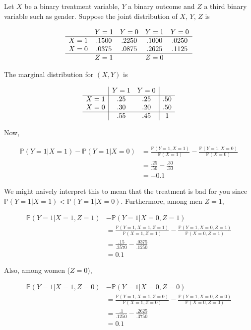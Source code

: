 Let \(X\) be a binary treatment variable, \(Y\) a binary outcome and
\(Z\) a third binary variable such as gender. Suppose the joint
distribution of \(X\), \(Y\), \(Z\) is

\[
\begin{array}{ccccc}
       & Y = 1 & Y = 0 & Y = 1 & Y = 0 \\
\hline
X = 1 & .1500 & .2250 & .1000 & .0250 \\
X = 0 & .0375 & .0875 & .2625 & .1125 \\
\hline
      & Z = 1 & & Z = 0 &
\end{array}
\]

The marginal distribution for \((X, Y)\) is

\[
\begin{array}{c|cc|c}
       & Y = 1 & Y = 0 & \\
\hline
X = 1 & .25 & .25 & .50 \\
X = 0 & .30 & .20 & .50 \\
\hline
      & .55 & .45 & 1
\end{array}
\]

Now,

\begin{align*}
\mathbb{P}(Y = 1 | X = 1) - \mathbb{P}(Y = 1 | X = 0) 
&= \frac{\mathbb{P}(Y = 1, X = 1)}{\mathbb{P}(X = 1)} - \frac{\mathbb{P}(Y = 1, X = 0)}{\mathbb{P}(X = 0)} \\
&= \frac{.25}{.50} - \frac{.30}{.50} \\
&= -0.1
\end{align*}

We might naively interpret this to mean that the treatment is bad for you since \(\mathbb{P}(Y = 1 | X = 1) < \mathbb{P}(Y = 1 | X = 0)\). Furthermore, among men \(Z = 1\),

\begin{align*}
\mathbb{P}(Y = 1 | X = 1, Z = 1) 
&- \mathbb{P}(Y = 1 | X = 0, Z = 1) \\
&= \frac{\mathbb{P}(Y = 1, X = 1, Z = 1)}{\mathbb{P}(X = 1, Z = 1)} - \frac{\mathbb{P}(Y = 1, X = 0, Z = 1)}{\mathbb{P}(X = 0, Z = 1)} \\
&= \frac{.15}{.3570} - \frac{.0375}{.1250} \\
&= 0.1
\end{align*}

Also, among women (\(Z = 0\)),

\begin{align*}
\mathbb{P}(Y = 1 | X = 1, Z = 0) 
&- \mathbb{P}(Y = 1 | X = 0, Z = 0) \\
&= \frac{\mathbb{P}(Y = 1, X = 1, Z = 0)}{\mathbb{P}(X = 1, Z = 0)} - \frac{\mathbb{P}(Y = 1, X = 0, Z = 0)}{\mathbb{P}(X = 0, Z = 0)} \\
&= \frac{.1}{.1250} - \frac{.2625}{.3750} \\
&= 0.1
\end{align*}

